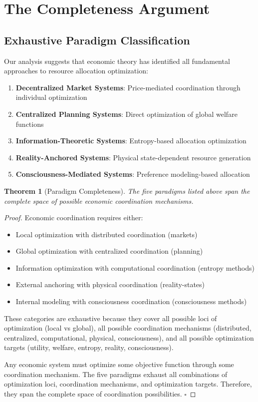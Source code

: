 \documentclass[12pt,a4paper]{article}
\newtheorem{theorem}{Theorem}
\begin{document}
\section{The Completeness Argument}

\subsection{Exhaustive Paradigm Classification}

Our analysis suggests that economic theory has identified all fundamental approaches to resource allocation optimization:

\begin{enumerate}
\item \textbf{Decentralized Market Systems}: Price-mediated coordination through individual optimization
\item \textbf{Centralized Planning Systems}: Direct optimization of global welfare functions
\item \textbf{Information-Theoretic Systems}: Entropy-based allocation optimization
\item \textbf{Reality-Anchored Systems}: Physical state-dependent resource generation
\item \textbf{Consciousness-Mediated Systems}: Preference modeling-based allocation
\end{enumerate}

\begin{theorem}[Paradigm Completeness]
The five paradigms listed above span the complete space of possible economic coordination mechanisms.
\end{theorem}

\begin{proof}
Economic coordination requires either:
\begin{itemize}
\item Local optimization with distributed coordination (markets)
\item Global optimization with centralized coordination (planning)
\item Information optimization with computational coordination (entropy methods)
\item External anchoring with physical coordination (reality-states)
\item Internal modeling with consciousness coordination (consciousness methods)
\end{itemize}

These categories are exhaustive because they cover all possible loci of optimization (local vs global), all possible coordination mechanisms (distributed, centralized, computational, physical, consciousness), and all possible optimization targets (utility, welfare, entropy, reality, consciousness).

Any economic system must optimize some objective function through some coordination mechanism. The five paradigms exhaust all combinations of optimization loci, coordination mechanisms, and optimization targets. Therefore, they span the complete space of coordination possibilities. $\square$
\end{proof}
\end{document}
